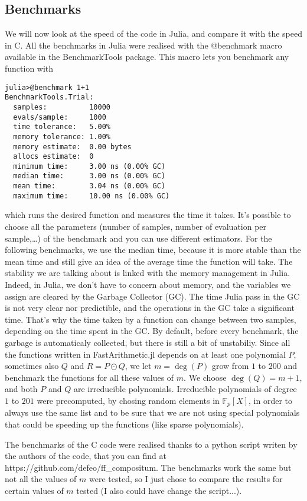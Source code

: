 \documentclass[a4paper,11pt]{article}
\theoremstyle{break}
\theoremstyle{definition}
\theoremstyle{remark}
\begin{document}
\subsection{Benchmarks}
We will now look at the speed of the code in Julia, and compare it with
the speed in C. All the benchmarks in Julia were realised with the
@benchmark macro available in the BenchmarkTools package. This macro lets you
benchmark any function with 

\begin{verbatim}
julia>@benchmark 1+1
BenchmarkTools.Trial: 
  samples:          10000
  evals/sample:     1000
  time tolerance:   5.00%
  memory tolerance: 1.00%
  memory estimate:  0.00 bytes
  allocs estimate:  0
  minimum time:     3.00 ns (0.00% GC)
  median time:      3.00 ns (0.00% GC)
  mean time:        3.04 ns (0.00% GC)
  maximum time:     10.00 ns (0.00% GC)
\end{verbatim}
which runs the desired function and measures the time it takes. It's possible
to choose all the parameters (number of samples, number of evaluation
per sample,\dots) of the benchmark and you can use different
estimators. For the following benchmarks, we use the median time, because it
is more stable than the mean time and still give an idea of the average time
the function will take. The stability we are talking about is linked with the
memory management in Julia. Indeed, in Julia, we don't have to concern about
memory, and the variables we assign are cleared by the Garbage Collector
(GC). The time Julia pass in the GC is not very clear nor predictible, and the
operations in the GC take a significant time. That's why the time taken by a
function can change between two samples, depending on the time spent in the GC.
By default, before every benchmark, the garbage is automaticaly collected, but
there is still a bit of unstabiliy.
Since all the functions written in FastArithmetic.jl depends on at least one
polynomial $P$, sometimes also $Q$ and $R=P\odot Q$, we let $m=\deg (P)$ grow
from $1$ to $200$ and benchmark the functions for all these values of $m$. We
choose $\deg (Q)=m+1$, and both $P$ and $Q$ are irreducible polynomials.
Irreducible polynomials of degree $1$ to $201$ were precomputed, by chosing
random elements in $\mathbb{F}_{p}[X]$, in order to
always use the same list and to be sure that we are not using special
polynomials that could be speeding up the functions (like sparse
polynomials). 

The benchmarks of the C code were realised thanks to a python 
script writen by the authors of the code, that you can find at 
https://github.com/defeo/ff\_compositum. The benchmarks work the same but not 
all the values of $m$ were tested, so I just chose to compare the results for 
certain values of $m$ tested (I also could have change the script...).
\end{document}
